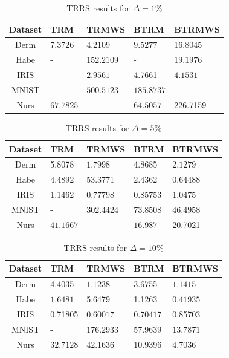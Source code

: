 \documentclass[letterpaper,12pt,titlepage,oneside,final]{book}
\begin{document}
	\begin{table}[h] 
		\centering 
		\begin{tabular}{ |c||l|l||l|l|| } 
			\hline 
			\textbf{Dataset} & \textbf{TRM} & \textbf{TRMWS} & \textbf{BTRM} & \textbf{BTRMWS} \\ 
			\hline 
			\hline 
			Derm &7.3726 & $\mathbf{4.2109}$ & $\mathbf{9.5277}$ &16.8045\\ 
			\hline 
			Habe & - & $\mathbf{152.2109}$ & - & $\mathbf{19.1976}$\\ 
			\hline 
			IRIS & - & $\mathbf{2.9561}$ &4.7661 & $\mathbf{4.1531}$\\ 
			\hline 
			MNIST & - & $\mathbf{500.5123}$ & $\mathbf{185.8737}$ & -\\ 
			\hline 
			Nurs & $\mathbf{67.7825}$ & - & $\mathbf{64.5057}$ &226.7159\\ 
			\hline 
		\end{tabular} 
		
		\caption{TRRS results for $\Delta = 1 \%$} \label{table:TRMWS1} 
	\end{table} 
	\begin{table}[h] 
		\centering 
		\begin{tabular}{ |c||l|l||l|l|| } 
			\hline 
			\textbf{Dataset} & \textbf{TRM} & \textbf{TRMWS} & \textbf{BTRM} & \textbf{BTRMWS} \\ 
			\hline 
			\hline 
			Derm &5.8078 & $\mathbf{1.7998}$ &4.8685 & $\mathbf{2.1279}$\\ 
			\hline 
			Habe & $\mathbf{4.4892}$ &53.3771 &2.4362 & $\mathbf{0.64488}$\\ 
			\hline 
			IRIS &1.1462 & $\mathbf{0.77798}$ & $\mathbf{0.85753}$ &1.0475\\ 
			\hline 
			MNIST & - & $\mathbf{302.4424}$ &73.8508 & $\mathbf{46.4958}$\\ 
			\hline 
			Nurs & $\mathbf{41.1667}$ & - & $\mathbf{16.987}$ &20.7021\\ 
			\hline 
		\end{tabular} 
		
		\caption{TRRS results for $\Delta = 5\%$} \label{table:TRMWS5}
	\end{table}
	\begin{table}[h] 
		\centering 
		\begin{tabular}{ |c||l|l||l|l|| } 
			\hline 
			\textbf{Dataset} & \textbf{TRM} & \textbf{TRMWS} & \textbf{BTRM} & \textbf{BTRMWS} \\ 
			\hline 
			\hline 
			Derm &4.4035 & $\mathbf{1.1238}$ &3.6755 & $\mathbf{1.1415}$\\ 
			\hline 
			Habe & $\mathbf{1.6481}$ &5.6479 &1.1263 & $\mathbf{0.41935}$\\ 
			\hline 
			IRIS &0.71805 & $\mathbf{0.60017}$ & $\mathbf{0.70417}$ &0.85703\\ 
			\hline 
			MNIST & - & $\mathbf{176.2933}$ &57.9639 & $\mathbf{13.7871}$\\ 
			\hline 
			Nurs & $\mathbf{32.7128}$ &42.1636 &10.9396 & $\mathbf{4.7036}$\\ 
			\hline 
		\end{tabular} 
		\caption{TRRS results for $\Delta = 10 \%$} \label{table:TRMWS10} \end{table}
	
\end{document}
